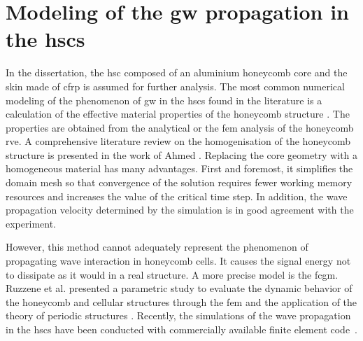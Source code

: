\section{Modeling of the \acs{gw} propagation in the \acsp{hsc}}
\label{sec:modelling}



In the dissertation, the \ac{hsc} composed of an aluminium honeycomb core and the skin made of \ac{cfrp} is assumed for further analysis.
The most common numerical modeling of the phenomenon of \ac{gw} in the \acp{hsc} found in the literature is a calculation of the effective material properties of the honeycomb structure \cite{baid2015dispersion, mustapha2014leaky, qi2008ultrasonic,  shi1995derivation, sikdar2016guided}.
The properties are obtained from the analytical \cite{gibson1982mechanics, malek2015effective} or the \ac{fem} \cite{catapano2014multi, chen2014analysis} analysis of the honeycomb \ac{rve}.
A comprehensive literature review on the homogenisation of the honeycomb structure is presented in the work of Ahmed \cite{ahmed2019homogenization}.
Replacing the core geometry with a homogeneous material has many advantages.
First and foremost, it simplifies the domain mesh so that convergence of the solution requires fewer working memory resources and increases the value of the critical time step.
In addition, the wave propagation velocity determined by the simulation is in good agreement with the experiment.

However, this method cannot adequately represent the phenomenon of propagating wave interaction in honeycomb cells.
It causes the signal energy not to dissipate as it would in a real structure.
A more precise model is the \ac{fcgm}. 
Ruzzene et al. presented a parametric study to evaluate the dynamic behavior of the honeycomb and cellular structures through the \ac{fem} and the application of the theory of periodic structures \cite{ruzzene2003wave}.
Recently, the simulations of the wave propagation in the \acp{hsc} have been conducted with commercially available finite element code~\cite{song2009guided, hosseini2013numerical, tian2015wavenumber, zhao2018wave}.

